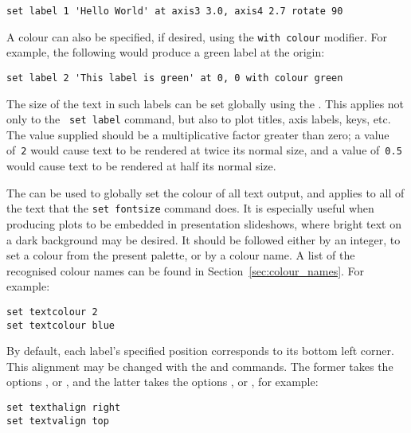 \begin{verbatim}
set label 1 'Hello World' at axis3 3.0, axis4 2.7 rotate 90
\end{verbatim}

A colour can also be specified, if desired, using the {\tt with colour}
modifier.  For example, the following would produce a green label at the origin:

\begin{verbatim}
set label 2 'This label is green' at 0, 0 with colour green
\end{verbatim}

 The size of the text in such labels can be set
globally using the . This applies not only to the {\tt
set label} command, but also to plot titles, axis labels, keys, etc. The value
supplied should be a multiplicative factor greater than zero; a
value of~{\tt 2} would cause text to be rendered at twice its normal size, and
a value of~{\tt 0.5} would cause text to be rendered at half its normal size.

 The  can be
used to globally set the colour of all text output, and applies to all of the
text that the {\tt set fontsize} command does. It is especially useful when
producing plots to be embedded in presentation slideshows, where bright text on
a dark background may be desired. It should be followed either by an integer,
to set a colour from the present palette, or by a colour name. A list of the
recognised colour names can be found in Section~\ref{sec:colour_names}.  For
example:

\begin{verbatim}
set textcolour 2
set textcolour blue
\end{verbatim}

By default, each label's specified
position corresponds to its bottom left corner. This alignment may be changed
with the  and  commands. The
former takes the options ,  or ,
and the latter takes the options ,  or
, for example:

\begin{verbatim}
set texthalign right
set textvalign top
\end{verbatim}

